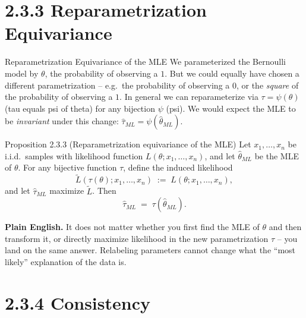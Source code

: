 \documentclass[aspectratio=169,10pt]{beamer}
\begin{document}
\section{2.3.3 Reparametrization Equivariance}

\begin{frame}{Reparametrization Equivariance of the MLE}
  We parameterized the Bernoulli model by $\theta$, the probability of
  observing a $1$. But we could equally have chosen a different
  parametrization -- e.g.\ the probability of observing a $0$, or the
  \emph{square} of the probability of observing a $1$. In general we can
  reparameterize via $\tau = \psi(\theta)$ (tau equals psi of theta) for any
  bijection $\psi$ (psi). We would expect the MLE to be \emph{invariant}
  under this change: $\widehat{\tau}_{ML} = \psi(\widehat{\theta}_{ML})$.

  \begin{block}{Proposition 2.3.3 (Reparametrization equivariance of the MLE)}
    Let $x_1,\dots,x_n$ be i.i.d.\ samples with likelihood function
    $L(\theta;x_1,\dots,x_n)$, and let $\widehat{\theta}_{ML}$ be the MLE of
    $\theta$. For any bijective function $\tau$, define the induced
    likelihood
    \[
      \tilde{L}(\tau(\theta);x_1,\dots,x_n) \;:=\; L(\theta;x_1,\dots,x_n),
    \]
    and let $\widehat{\tau}_{ML}$ maximize $\tilde{L}$. Then
    \[
      \widehat{\tau}_{ML} \;=\; \tau(\widehat{\theta}_{ML}).
    \]
  \end{block}
  \textbf{Plain English.} It does not matter whether you first find the MLE
  of $\theta$ and then transform it, or directly maximize likelihood in the
  new parametrization $\tau$ -- you land on the same answer. Relabeling
  parameters cannot change what the ``most likely'' explanation of the data
  is.
\end{frame}

\section{2.3.4 Consistency}
\end{document}
